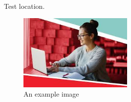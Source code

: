 \documentclass{article}
\begin{document}
\lipsum[1-4] %
Test location.
\begin{figure}[ht]
\centering
\includegraphics[width=0.5\textwidth]{example-image-a.png}
\caption{An example image}
\end{figure}
\lipsum[6-10] %
\end{document}

